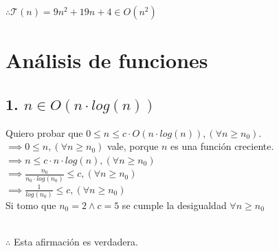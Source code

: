 \documentclass[12 pt]{article}
\begin{document}
\begin{itemize}
\begin{center}
                \(\therefore \mathcal{T}(n) = 9n^{2}+19n+4 \in O(n^{2})\)
            \end{center} 
    \end{itemize}

\newpage

\section*{Análisis de funciones}
    \subsection*{1. \(n \in O(n \cdot log(n))\)}
        Quiero probar que \(0 \leq n \leq c \cdot O(n \cdot log(n)), (\forall n \geq n_{0})\). \\
        \(\implies 0 \leq n, (\forall n \geq n_{0})\) vale, porque $n$ es una función creciente. \\
        \(\implies n \leq c \cdot n \cdot log(n), (\forall n \geq n_{0})\) \\
        \(\implies \frac{n_{0}}{n_{0} \cdot log(n_{0})} \leq c, (\forall n \geq n_{0})\) \\
        \(\implies \frac{1}{log(n_{0})} \leq c, (\forall n \geq n_{0})\) \\
        Si tomo que \(n_{0} = 2 \wedge c = 5\) se cumple la desigualdad \(\forall n \geq n_{0}\)\\
        \begin{center}
             \\              
            \(\therefore\) Esta afirmación es verdadera.
        \end{center} 
\end{document}
